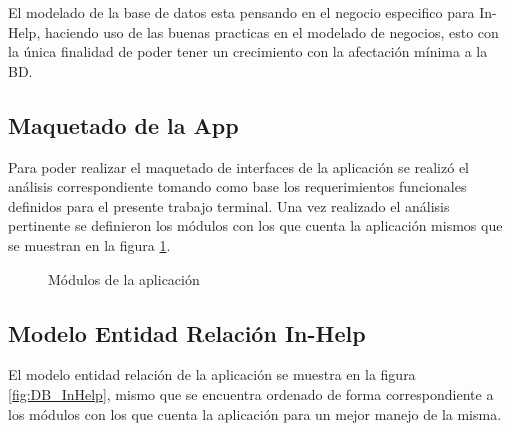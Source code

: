 El modelado de la base de datos esta pensando en el negocio especifico para In-Help, haciendo uso de las buenas practicas en el modelado de negocios, esto con la única finalidad de poder tener un crecimiento con la afectación mínima a la BD.

\subsection{Maquetado de la App}
Para poder realizar el maquetado de interfaces de la aplicación se realizó el análisis correspondiente tomando como base los requerimientos funcionales definidos para el presente trabajo terminal. Una vez realizado el análisis pertinente se definieron los módulos con los que cuenta la aplicación mismos que se muestran en la figura \ref{fig:MaquetadoelaApp}.

\begin{figure}[htbp!]
	\centering
	\caption{Módulos de la aplicación}
	\label{fig:MaquetadoelaApp}
\end{figure}

\subsection{Modelo Entidad Relación In-Help}

El modelo entidad relación de la aplicación se muestra en la figura \ref{fig:DB_InHelp}, mismo que se encuentra ordenado de forma correspondiente a los módulos con los que cuenta la aplicación para un mejor manejo de la misma.


